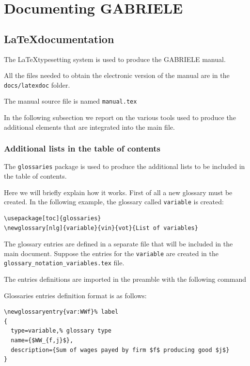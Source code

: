 \documentclass{book}
\begin{document}
\part{Documenting GABRIELE}


\chapter{\LaTeX documentation}
The \LaTeX typesetting system is used to produce the GABRIELE manual.

All the files needed to obtain the electronic version of the manual are in the \verb+docs/latexdoc+ folder.

The manual source file is named \verb+manual.tex+

In the following subsection we report on the various tools used to produce the additional elements that are integrated into the main file. 

\section{Additional lists in the table of contents}
The \verb+glossaries+ package is used to produce the additional lists to be included in the table of contents.

Here we will briefly explain how it works. First of all a new glossary must be created. In the following example, the glossary called \verb+variable+ is created: 

\begin{verbatim}
\usepackage[toc]{glossaries}
\newglossary[nlg]{variable}{vin}{vot}{List of variables}
\end{verbatim}

The glossary entries are defined in a separate file that will be included in the main document. Suppose the entries for the \verb+variable+ are created in the \verb+glossary_notation_variables.tex+ file. 

The entries definitions are imported in the preamble with the following command\\
\verb++

Glossaries entries definition format is as follows:

\begin{verbatim}
\newglossaryentry{var:WWf}% label 
{ 
  type=variable,% glossary type 
  name={$WW_{f,j}$}, 
  description={Sum of wages payed by firm $f$ producing good $j$} 
}
\end{verbatim}
\end{document}
